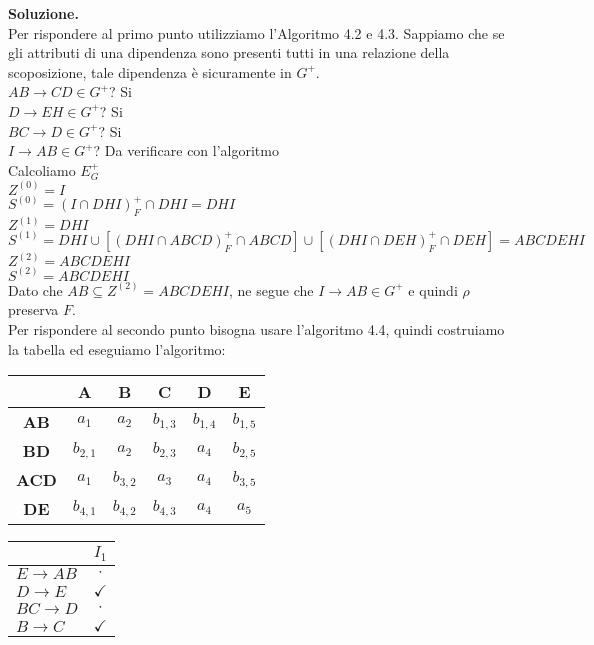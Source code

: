  \noindent\textbf{\fontsize{14pt}{1em}Soluzione.}\\
 Per rispondere al primo punto utilizziamo l'Algoritmo 4.2 e 4.3. Sappiamo che se gli attributi di una dipendenza sono presenti
 tutti in una relazione della scoposizione, tale dipendenza è sicuramente in $G^+$.\\
 $AB\rightarrow CD \in G^+$? Si\\
 $D\rightarrow EH \in G^+$? Si\\
 $BC\rightarrow D \in G^+$? Si\\
 $I\rightarrow AB \in G^+$? Da verificare con l'algoritmo\\
 
 \noindent Calcoliamo $E^+_G$\\
 $Z^{(0)}=I$\\
 $S^{(0)}=(I\cap DHI)^+_F \cap DHI= DHI$\\
 $Z^{(1)}=DHI$\\
 $S^{(1)}=DHI \cup [(DHI \cap ABCD)^+_F \cap ABCD] \cup [(DHI \cap DEH)^+_F \cap DEH] = ABCDEHI$\\
 $Z^{(2)}=ABCDEHI$\\
 $S^{(2)}=ABCDEHI$\\
 
 \noindent Dato che $AB \subseteq Z^{(2)} = ABCDEHI$, ne segue che $I\rightarrow AB \in G^+$ e quindi $\rho$ preserva $F$.\\
 
\noindent Per rispondere al secondo punto bisogna usare l'algoritmo 4.4, quindi costruiamo la tabella ed eseguiamo l'algoritmo:

\begin{multicols}{2}
   \begin{center}
  \begin{tabular}{c|c|c|c|c|c}
    & \textbf{A} & \textbf{B} &\textbf{C} &\textbf{D}     &\textbf{E}\\
   \hline
   \textbf{AB} & $a_1$ & $a_2$ & $b_{1,3}$ & $b_{1,4}$ & $b_{1,5}$ \\
   \hline
   \textbf{BD}  &$b_{2,1}$ & $a_2$  & $b_{2,3}$ & $a_4$ & $b_{2,5}$ \\
   \hline
   \textbf{ACD} & $a_1$ & $b_{3,2}$  & $a_3$ & $a_4$ & $b_{3,5}$\\
    \hline
   \textbf{DE} & $b_{4,1}$   & $b_{4,2}$  & $b_{4,3}$ & $a_4$ & $a_5$\\
  \end{tabular}
 \end{center}
 
  \begin{center}
  \begin{tabular}{l|c}
   & $I_1$\\
   \hline
   $E\rightarrow AB$ & $\cdot$ \\
   $D\rightarrow E$ & $\checkmark$ \\
   $BC\rightarrow D$ & $\cdot$ \\
   $B\rightarrow C$ & $\checkmark$ \\
   \end{tabular}
 \end{center}
 \end{multicols}
 
